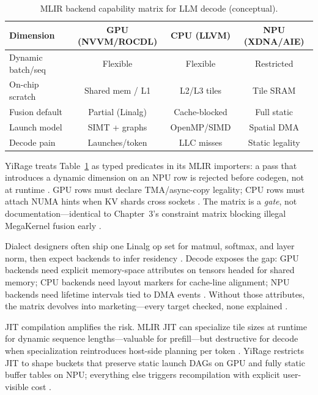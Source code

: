 \begin{table}[t]
\centering
\caption{MLIR backend capability matrix for LLM decode (conceptual).}
\label{tab:mlir_hw_matrix}
\begin{tabular}{lccc}
\toprule
\textbf{Dimension} & \textbf{GPU (NVVM/ROCDL)} & \textbf{CPU (LLVM)} & \textbf{NPU (XDNA/AIE)} \\
\midrule
Dynamic batch/seq & Flexible & Flexible & Restricted \\
On-chip scratch & Shared mem / L1 & L2/L3 tiles & Tile SRAM \\
Fusion default & Partial (Linalg) & Cache-blocked & Full static \\
Launch model & SIMT + graphs & OpenMP/SIMD & Spatial DMA \\
Decode pain & Launches/token & LLC misses & Static legality \\
\bottomrule
\end{tabular}
\end{table}

YiRage treats Table~\ref{tab:mlir_hw_matrix} as typed predicates in its MLIR importers: a pass that introduces a dynamic dimension on an NPU row is rejected before codegen, not at runtime \citep{yirage2026}. GPU rows must declare TMA/async-copy legality; CPU rows must attach NUMA hints when KV shards cross sockets \citep{kwon2023vllm,dlbook}. The matrix is a \emph{gate}, not documentation---identical to Chapter~3's constraint matrix blocking illegal MegaKernel fusion early \citep{dao2022flashattention}.

Dialect designers often ship one Linalg op set for matmul, softmax, and layer norm, then expect backends to infer residency \citep{chen2020compilerbasedhardw}. Decode exposes the gap: GPU backends need explicit memory-space attributes on tensors headed for shared memory; CPU backends need layout markers for cache-line alignment; NPU backends need lifetime intervals tied to DMA events \citep{nvidia2022hopper,amd2024xdna}. Without those attributes, the matrix devolves into marketing---every target checked, none explained \citep{yirage2026}.

JIT compilation amplifies the risk. MLIR JIT can specialize tile sizes at runtime for dynamic sequence lengths---valuable for prefill---but destructive for decode when specialization reintroduces host-side planning per token \citep{taxbreak2026,nvidia2024cudagraphs}. YiRage restricts JIT to shape buckets that preserve static launch DAGs on GPU and fully static buffer tables on NPU; everything else triggers recompilation with explicit user-visible cost \citep{yirage2026,patel2025llminference}.

